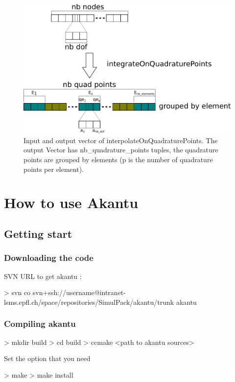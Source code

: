 \documentclass[a4paper,11pt]{book}
\begin{document}
\begin{figure}[!htb]
  \centering
  \includegraphics[width=\textwidth]{figures/interpolate}
  \caption{Input and output  vector of interpolateOnQuadraturePoints. The output
    Vector has nb\_quadrature\_points tuples,  the quadrature points are grouped
    by elements (p is the number of quadrature points per element).}
  \label{fig:interpolate-storage}
\end{figure}


\chapter{How to use Akantu}
\section{Getting start}
\subsection{Downloading the code}
SVN URL to get akantu :
\begin{command}
> svn co svn+ssh://username@intranet-lsms.epfl.ch/space/repositories/SimulPack/akantu/trunk akantu
\end{command}

\subsection{Compiling akantu}
\begin{command}
> mkdir build
> cd build
> ccmake <path to akantu sources>
\end{command}

Set the option that you need

\begin{command}
> make
> make install
\end{command}
\end{document}
